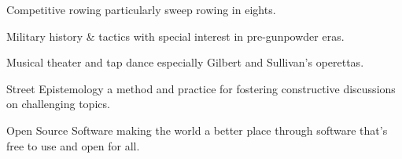 


    

\begin{cvhonors}

    \cvhonor
        {Competitive rowing} %
        {particularly sweep rowing in eights.} %
        {} %
        {\textbullet} %
    
    \cvhonor
        {Military history \& tactics} %
        {with special interest in pre-gunpowder eras.} %
        {} %
        {\textbullet} %

    \cvhonor
        {Musical theater and tap dance} %
        {especially Gilbert and Sullivan’s operettas.} %
        {} %
        {\textbullet} %

    \cvhonor
        {Street Epistemology} %
        {a method and practice for fostering constructive discussions on challenging topics.} %
        {} %
        {\textbullet} %

    \cvhonor
        {Open Source Software} %
        {making the world a better place through software that's free to use and open for all.} %
        {} %
        {\textbullet} %
    \end{cvhonors}